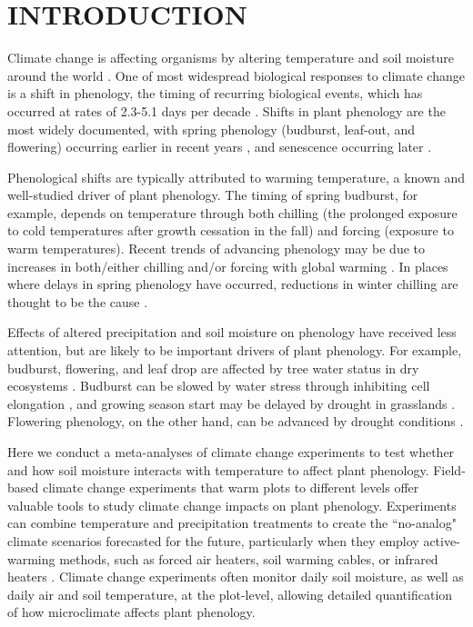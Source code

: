 \documentclass{article}
\begin{document}
\section* {INTRODUCTION}
\par Climate change is affecting organisms by altering temperature and soil moisture around the world \citep{parmesan2006,chen2011}. One of most widespread biological responses to climate change is a shift in phenology, the timing of recurring biological events, which has occurred at rates of 2.3-5.1 days per decade \citep{parmesan2006,poloczanska2013,root2003}. Shifts in plant phenology are the most widely documented, with spring phenology (budburst, leaf-out, and flowering) occurring earlier in recent years \citep{wolkovich2012}, and senescence occurring later \citep{taylor2008,delpierre2009}. 
\par Phenological shifts are typically attributed to warming temperature, a known and well-studied driver of plant phenology. The timing of spring budburst, for example, depends on temperature through both chilling (the prolonged exposure to cold temperatures after growth cessation in the fall) and forcing (exposure to warm temperatures). Recent trends of advancing phenology may be due to increases in both/either chilling and/or forcing with global warming \citep{fujisawa2010, ibanez2010,cook2012b}. In places where delays in spring phenology have occurred, reductions in winter chilling are thought to be the cause \citep{yu2010}. 
\par Effects of altered precipitation and soil moisture on phenology have received less attention, but are likely to be important drivers of plant phenology. For example, budburst, flowering, and leaf drop are affected by tree water status in dry ecosystems \citep{essiamah1986,reich1984, van1993}. Budburst can be slowed by water stress through inhibiting cell elongation \citep{essiamah1986}, and growing season start may be delayed by drought in grasslands \cite{cui2017}. Flowering phenology, on the other hand, can be advanced by drought conditions \citep{hamann2018}. 
\par Here we conduct a meta-analyses of climate change experiments to test whether and how soil moisture interacts with temperature to affect plant phenology. Field-based climate change experiments that warm plots to different levels offer valuable tools to study climate change impacts on plant phenology. Experiments can combine temperature and precipitation treatments to create the ``no-analog" climate scenarios forecasted for the future, particularly when they employ active-warming methods, such as forced air heaters, soil warming cables, or infrared heaters \citep{shaver2000,williams2007b,aronson2009}. Climate change experiments often monitor daily soil moisture, as well as daily air and soil temperature, at the plot-level, allowing detailed quantification of how microclimate affects plant phenology. 
\end{document}
